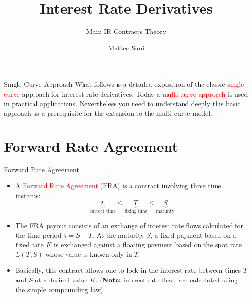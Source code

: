 \documentclass{beamer}
\title{Interest Rate Derivatives}
\subtitle{Main IR Contracts Theory}
\author{\href{mailto:matteo.sani@unisi.it}{Matteo Sani}}
\begin{document}
\begin{frame}[plain]
  \maketitle
\end{frame}

\begin{frame}{Single Curve Approach}
  What follows is a detailed exposition of the classic \textcolor{red}{single curve}
  approach for interest rate derivatives. Today a \textcolor{red}{multi-curve approach} is
  used in practical applications. Nevertheless you need to understand
  deeply this basic approach as a prerequisite for the extension to the
  multi-curve model.
\end{frame}          

\section{Forward Rate Agreement}
\begin{frame}{Forward Rate Agreement}
	\begin{itemize}	
		\item<1-> A \textcolor{red}{Forward Rate Agreement} (FRA) is a contract involving three time instants: %
		\begin{equation*}
			\underbrace{t}_{\text{current time}} \leq \underbrace{T}_{\text{fixing time}} \leq\underbrace{S}_{\text{maturity}}
		\end{equation*}
		\item<2-> The FRA payout consists of an exchange of interest rate flows calculated for the time period $\tau=S-T$. At the maturity $S$, a fixed payment based on a fixed rate $K$ is exchanged against a floating payment based on the spot rate $L(T, S)$ whose value is known only in $T$.
		\item<3-> Basically, this contract allows one to lock-in the interest rate between times $T$ and $S$ at a desired value $K$. (\textbf{Note:} interest rate flows are calculated using the simple compounding law).
	\end{itemize}
\end{frame}
\end{document}
